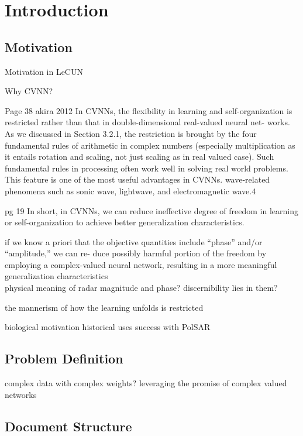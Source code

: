 \chapter{Introduction} \label{chap:intro}

\section{Motivation} \label{sect:thefirst}
Motivation in LeCUN

Why CVNN?

Page 38 akira 2012
 In CVNNs, the flexibility in learning and self-organization
is restricted rather than that in double-dimensional real-valued neural net-
works. As we discussed in Section 3.2.1, the restriction is brought by the four
fundamental rules of arithmetic in complex numbers (especially multiplication as it entails rotation and scaling, not just scaling as in real valued case). Such fundamental rules
in processing often work well in solving real world problems. This feature is
one of the most useful advantages in CVNNs. wave-related phenomena
such as sonic wave, lightwave, and electromagnetic wave.4

pg 19
In short, in CVNNs, we can reduce ineffective degree of freedom in
learning or self-organization to achieve better generalization characteristics.

 if we know a priori
that the objective quantities include “phase” and/or “amplitude,” we can re-
duce possibly harmful portion of the freedom by employing a complex-valued
neural network, resulting in a more meaningful generalization characteristics\\

physical meaning of radar magnitude and phase? discernibility lies in them?

the mannerism of how the learning unfolds is restricted


biological motivation
historical uses
success with PolSAR




\section{Problem Definition} \label{sect:thefirst}
complex data with complex weights?
leveraging the promise of complex valued networks

\section{Document Structure} \label{sect:thefirst}

